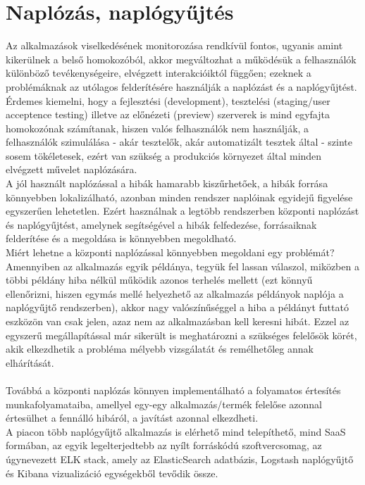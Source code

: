 \section{Naplózás, naplógyűjtés}
\label{sect:logging}
Az alkalmazások viselkedésének monitorozása rendkívül fontos, ugyanis amint kikerülnek a belső homokozóból, akkor megváltozhat a működésük a felhasználók különböző tevékenységeire, elvégzett interakcióiktól függően; ezeknek a problémáknak az utólagos felderítésére használják a naplózást és a naplógyűjtést. Érdemes kiemelni, hogy a fejlesztési (development), tesztelési (staging/user acceptence testing) illetve az előnézeti (preview) szerverek is mind egyfajta homokozónak számítanak, hiszen valós felhasználók nem használják, a felhasználók szimulálása - akár tesztelők, akár automatizált tesztek által - szinte sosem tökéletesek, ezért van szükség a produkciós környezet által minden elvégzett művelet naplózására.
\\
A jól használt naplózással a hibák hamarabb kiszűrhetőek, a hibák forrása könnyebben lokalizálható, azonban minden rendszer naplóinak egyidejű figyelése egyszerűen lehetetlen. Ezért használnak a legtöbb rendszerben központi naplózást és naplógyűjtést, amelynek segítségével a hibák felfedezése, forrásaiknak felderítése és a megoldása is könnyebben megoldható.\\
Miért lehetne a központi naplózással könnyebben megoldani egy problémát? Amennyiben az alkalmazás egyik példánya, tegyük fel lassan válaszol, miközben a többi példány hiba nélkül működik azonos terhelés mellett (ezt könnyű ellenőrizni, hiszen egymás mellé helyezhető az alkalmazás példányok naplója a naplógyűjtő rendszerben), akkor nagy valószínűséggel a hiba a példányt futtató eszközön van csak jelen, azaz nem az alkalmazásban kell keresni hibát. Ezzel az egyszerű megállapítással már sikerült is meghatározni a szükséges felelősök körét, akik elkezdhetik a probléma mélyebb vizsgálatát és remélhetőleg annak elhárítását.\\
\hfill\\
Továbbá a központi naplózás könnyen implementálható a folyamatos értesítés munkafolyamataiba, amellyel egy-egy alkalmazás/termék felelőse azonnal értesülhet a fennálló hibáról, a javítást azonnal elkezdheti.
\hfill\\
A piacon több naplógyűjtő alkalmazás is elérhető mind telepíthető, mind SaaS formában, az egyik legelterjedtebb az nyílt forráskódú szoftvercsomag, az úgynevezett ELK stack, amely az ElasticSearch adatbázis, Logstash naplógyűjtő és Kibana vizualizáció egységekből tevődik össze.
\\
